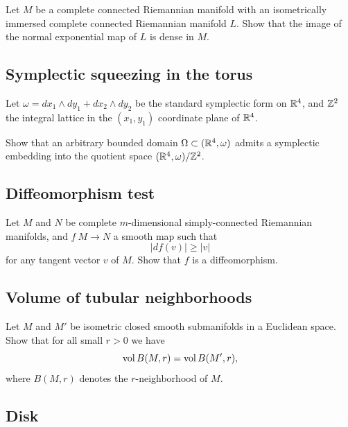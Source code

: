 \begin{pr}
Let $M$ be a complete connected Riemannian manifold
with an isometrically immersed complete connected Riemannian manifold $L$.
Show that the image of the
normal exponential map of $L$ is dense in $M$.
\end{pr}

\subsection*{Symplectic squeezing in the torus}
\label{Symplectic squeezing in the torus}



\begin{pr}
Let 
$\omega=dx_1\wedge dy_1+ dx_2\wedge dy_2$
be the standard symplectic form on $\mathbb{R}^4$, and $\mathbb{Z}^2$ the integral lattice in the $(x_1,y_1)$ coordinate plane of $\mathbb{R}^4$.

Show that an arbitrary bounded domain $\Omega\subset (\mathbb{R}^4,\omega)$
admits a symplectic embedding into the quotient space $(\mathbb{R}^4,\omega)/\mathbb{Z}^2$. 
\end{pr}

\subsection*{Diffeomorphism test\easy}
\label{Diffeomorphism test}


\begin{pr}
Let $M$ and $N$ be complete $m$-dimensional simply-connected Riemannian manifolds, and $f\:M\to N$ a smooth map such that 
$$|df(v)|\ge |v|$$
for any tangent vector $v$ of $M$.
Show that $f$ is a diffeomorphism.
\end{pr}

\subsection*{Volume of tubular neighborhoods\thm}
\label{Volume of tubular neighborhoods}

\begin{pr}
Let $M$ and $M'$ be isometric closed smooth submanifolds in a Euclidean space.
Show that for all small $r>0$ we have
$$\operatorname{\rm vol}\nolimits B(M,r)=\operatorname{\rm vol}\nolimits B(M',r),$$
where $B(M,r)$ denotes the $r$-neighborhood of $M$.
\end{pr}

\subsection*{Disk\hard}
\label{disk}

